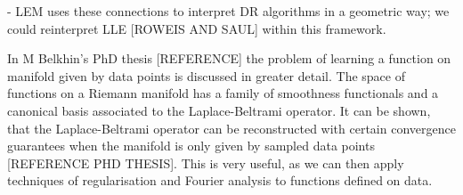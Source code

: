 \documentclass[journal, a4paper]{IEEEtran}
\begin{document}
- LEM uses these connections to interpret DR algorithms in a geometric way; we could reinterpret LLE [ROWEIS AND SAUL] within this framework. 




In M Belkhin's PhD thesis [REFERENCE] the problem of learning a function on manifold given by data points is discussed in greater detail. The space of functions on a Riemann manifold has a family of smoothness functionals and a canonical basis associated to the Laplace-Beltrami operator. It can be shown, that the Laplace-Beltrami operator can be reconstructed with certain convergence guarantees when the manifold is only given by sampled data points [REFERENCE PHD THESIS]. This is very useful, as we can then apply techniques of regularisation and Fourier analysis to functions defined on data. 
 
 
\end{document}
